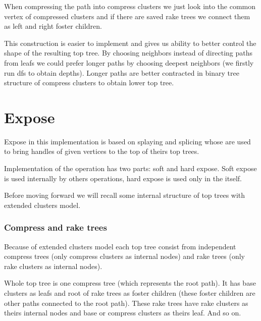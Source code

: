 When compressing the path into compress clusters we just look into the common
vertex of compressed clusters and if there are saved rake trees we connect them
as left and right foster children.

This construction is easier to implement and gives us ability to better control
the shape of the resulting top tree. By choosing neighbors instead of directing
paths from leafs we could prefer longer paths by choosing deepest neighbors
(we firstly run \gls{dfs} to obtain depths). Longer paths are better contracted
in binary tree structure of compress clusters to obtain lower top tree.

\section{Expose}

Expose in this implementation is based on splaying and splicing whose are used
to bring handles of given vertices to the top of theirs top trees.

Implementation of the \Expose{} operation has two parts: soft and hard expose. Soft
expose is used internally by others operations, hard expose is used only in the
\Expose{} itself.

Before moving forward we will recall some internal structure of top trees with
extended clusters model.


\subsubsection{Compress and rake trees}

Because of extended clusters model each top tree consist from independent
{\I compress trees} (only compress clusters as internal nodes) and
{\I rake trees} (only rake clusters as internal nodes).

Whole top tree is one compress tree (which represents the {\I root path}). It
has base clusters as leafs and root of rake trees as foster children (these
foster children are other paths connected to the root path). These rake trees
have rake clusters as theirs internal nodes and base or compress clusters as
theirs leaf. And so on.

